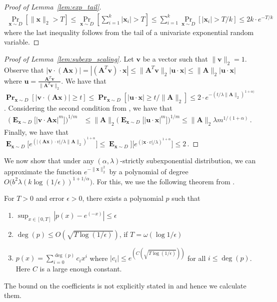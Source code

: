\documentclass{theoretics}
\newcommand\twonorm[1]{\|#1\|_2}
\renewcommand\vec[1]{\mathbf{#1}}
\DeclareMathOperator*{\pr}{\mathbf{Pr}}
\DeclareMathOperator*{\E}{\mathbf{E}}
\newcommand{\1}{\Ind}
\newcommand{\x}{\vec x}
\renewcommand{\vv}{\vec v}
\newcommand{\vu}{\vec u}
\begin{document}
\begin{proof}[Proof of Lemma~\ref{lem:exp_tail}]
\label{proof:exp_tail}
    \begin{align*}
        \Pr_{\x\sim D}\left[\twonorm{\x}>T\right]\leq \Pr_{\x\sim D}\left[\sum_{i=1}^{k}|\x_i|>T\right]
        \leq \sum_{i=1}^{k}\Pr_{\x\sim D}\left[|\x_i|>T/k\right]
        \leq 2k\cdot e^{-T/k}
    \end{align*}
    where the last inequality follows from the tail of a univariate exponential random variable.
\end{proof}
\begin{proof}[Proof of Lemma~\ref{lem:subexp_scaling}]
\label{proof:subexp_scaling}
Let $\vv$ be a vector such that $\twonorm{\vv}=1$. Observe that $|\vv\cdot (\vec A\x)|=|(\vec A^T\vv)\cdot \x|\leq \twonorm{\vec A^T\vv}|\vu\cdot \x|\leq \twonorm{\vec A}|\vu\cdot \x|$ where $\vu=\frac{\vec A^T\vv}{\twonorm{\vec A^T\vv}}$. We have that $\pr_{\x\sim D}[|\vv\cdot (\vec A\x)|\geq t]\leq \pr_{\x\sim D}[|\vu\cdot \x|\geq t/\twonorm{\vec A}]\leq 2\cdot e^{-(t/\lambda\twonorm{\vec A})^{1+\alpha)}}$. Considering the second condition from , we have that \begin{align*}
    \biggl(\E_{\x\sim D}\bigl[|\vv\cdot \vec A\x|^m\bigr]\biggr)^{1/m}&\leq \twonorm{\vec A}\biggl(\E_{\x\sim D}\bigl[|\vu\cdot\x|^m \bigr]\biggr)^{1/m}
    \leq \twonorm{\vec A}\lambda m^{1/(1+\alpha)}\,.
\end{align*} Finally, we have that
$\E_{\x\sim D}\bigl[e^{(|(\vec A\x)\cdot v|/\lambda\twonorm{\vec A})^{1+\alpha}}\bigr]\leq \E_{\x\sim D}]\bigl[e^{(|\x\cdot v|/\lambda)^{1+\alpha}}\bigr]\leq 2\,.$ 
\end{proof}


We now show that under any $(\alpha,\lambda)$-strictly subexponential distribution, we can approximate the function $e^{-\twonorm{\x}^2}$ by a polynomial of degree $O\bigl(b^{2}\lambda (k\log(1/\epsilon))^{1+1/\alpha} \bigr)$. For this, we use the following theorem from \cite{AA22}.

\begin{lemma}
\label{thm:exp_approx}
    For $T>0$ and error $\epsilon>0$, there exists a polynomial $p$ such that
   \begin{enumerate}
    \item $\sup_{x\in [0,T]}|p(x)-e^{(-x)}|\leq \epsilon $   
    \item $\deg(p)\leq O(\sqrt{T\log(1/\epsilon)})$, if $T=\omega\left(\log1/\epsilon\right)$
    \item $p(x)=\sum_{i=0}^{\deg(p)}c_i x^i$ where $|c_i|\leq e^{\left(C\left(\sqrt{T\log(1/\epsilon)}\right)\right)}$ for all $i\leq \deg(p)$. Here $C$ is a large enough constant.
   \end{enumerate}
\end{lemma}
The bound on the coefficients is not explicitly stated in \cite{AA22} and hence we calculate them.
\end{document}
